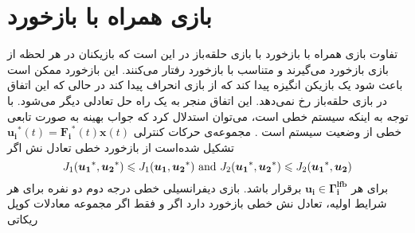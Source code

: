 \section{بازی همراه با بازخورد}
تفاوت بازی همراه با بازخورد با بازی حلقه‌باز در این است که بازیکنان در هر لحظه از بازی بازخورد می‌گیرند و متناسب با بازخورد رفتار می‌کنند. این بازخورد ممکن است باعث شود یک بازیکن انگیزه پیدا کند که از بازی انحراف پیدا کند در حالی که این اتفاق در بازی حلقه‌باز رخ نمی‌دهد. این اتفاق منجر به یک راه حل تعادلی دیگر می‌شود. 
با توجه به اینکه سیستم خطی است، می‌توان استدلال کرد که جواب بهینه به صورت تابعی خطی از وضعیت سیستم است \cite{article1}
.
%
مجموعه‌ی حرکات کنترلی 
$\boldsymbol{u_i}^*(t)=\boldsymbol{F_i}^*(t)\boldsymbol{x}(t)$
تشکیل شده‌است از بازخورد خطی تعادل نش اگر
\begin{equation*}
	J_1(\boldsymbol{u_1}^*, \boldsymbol{u_2}^*)\leq J_1(\boldsymbol{u_1}, \boldsymbol{u_2}^*)\text{\rm{ and }}
	J_2(\boldsymbol{u_1}^*,\boldsymbol{ u_2}^*)\leq J_2(\boldsymbol{u_1}^*, \boldsymbol{u_2})
\end{equation*}
برای هر 
$\boldsymbol{u_i}\in \boldsymbol{\Gamma^{lfb}_i}$
برقرار باشد.
بازی دیفرانسیلی خطی درجه دوم دو نفره برای هر شرایط اولیه، تعادل نش خطی بازخورد دارد اگر و فقط اگر مجموعه معادلات کوپل ریکاتی

